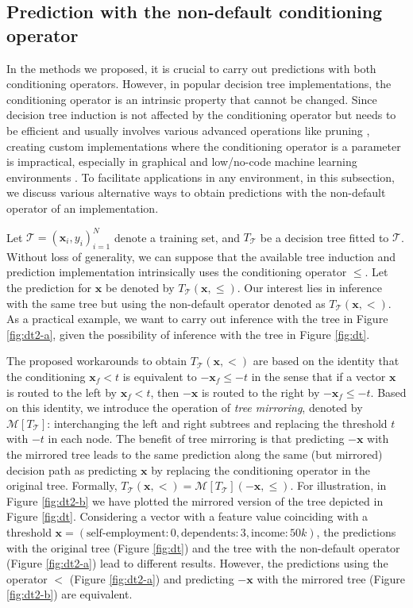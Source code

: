 \documentclass[sn-mathphys]{sn-jnl}%
\theoremstyle{thmstyleone}%
\theoremstyle{thmstyletwo}%
\theoremstyle{thmstylethree}%
\begin{document}
\subsection{Prediction with the non-default conditioning operator}
\label{sec:equiv}

In the methods we proposed, it is crucial to carry out predictions with both conditioning operators. However, in popular decision tree implementations, the conditioning operator is an intrinsic property that cannot be changed. Since decision tree induction is not affected by the conditioning operator but needs to be efficient and usually involves various advanced operations like pruning \citep{sklearn}, creating custom implementations where the conditioning operator is a parameter is impractical, especially in graphical and low/no-code machine learning environments \citep{nocode}.
To facilitate applications in any environment, in this subsection, we discuss various alternative ways to obtain predictions with the non-default operator of an implementation.

Let $\mathcal{T} = (\mathbf{x}_i, y_i)_{i=1}^N$ denote a training set, and $T_{\mathcal{T}}$ be a decision tree fitted to $\mathcal{T}$. Without loss of generality, we can suppose that the available tree induction and prediction implementation intrinsically uses the conditioning operator $\leq$. 
Let the prediction for $\mathbf{x}$ be denoted by $T_{\mathcal{T}}(\mathbf{x}, \leq)$. Our interest lies in inference with the same tree but using the non-default operator denoted as $T_{\mathcal{T}}(\mathbf{x}, <)$. As a practical example, we want to carry out inference with the tree in Figure \ref{fig:dt2-a}, given the possibility of inference with the tree in Figure \ref{fig:dt}.

The proposed workarounds to obtain $T_{\mathcal{T}}(\mathbf{x}, <)$ are based on the identity that the conditioning $\mathbf{x}_f < t$ is equivalent to $-\mathbf{x}_f \leq -t$ in the sense that if a vector $\mathbf{x}$ is routed to the left by $\mathbf{x}_f < t$, then $-\mathbf{x}$ is routed to the right by $-\mathbf{x}_f \leq -t$. Based on this identity, we introduce the operation of \emph{tree mirroring}, denoted by $\mathcal{M}[T_{\mathcal{T}}]$: interchanging the left and right subtrees and replacing the threshold $t$ with $-t$ in each node. 
The benefit of tree mirroring is that predicting $-\mathbf{x}$ with the mirrored tree leads to the same prediction along the same (but mirrored) decision path as predicting $\mathbf{x}$ by replacing the conditioning operator in the original tree. Formally, $T_{\mathcal{T}}(\mathbf{x}, <) = \mathcal{M}[T_{\mathcal{T}}](-\mathbf{x}, \leq)$.
For illustration, in Figure \ref{fig:dt2-b} we have plotted the mirrored version of the tree depicted in Figure \ref{fig:dt}. Considering a vector with a feature value coinciding with a threshold $\mathbf{x} = (\text{self-employment}: 0, \text{dependents}: 3, \text{income}: 50k)$, the predictions with the original tree (Figure \ref{fig:dt}) and the tree with the non-default operator (Figure \ref{fig:dt2-a}) lead to different results. However, the predictions using the operator $<$ (Figure \ref{fig:dt2-a}) and predicting $-\mathbf{x}$ with the mirrored tree (Figure \ref{fig:dt2-b}) are equivalent. 
\end{document}
